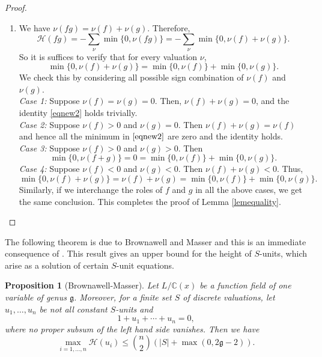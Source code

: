 \documentclass[12pt]{amsart}
\newtheorem{proposition}[theorem]{Proposition}
\newcommand{\C}{\mbox{$\mathbb C$}}     %
\begin{document}
\begin{proof}
\begin{enumerate}
            \[
            \min\{0,\nu(f+g)\}=\nu(f)=\min\{0,\nu(f)\}+\min\{0,\nu(g)\}
            \]and\eqref{eqnew1} holds. This completes the proof of part $(i)$.
            \item[($ii$)] We have $\nu(fg)=\nu(f)+\nu(g)$. Therefore,
            \begin{equation*}
                \mathcal{H}(fg)=-\sum_{\nu} \min \{0,\nu(fg)\}= -\sum_{\nu} \min \{0,\nu(f)+\nu(g)\}. 
            \end{equation*} So it is suffices to verify that for every valuation $\nu$,
            \begin{equation}\label{eqnew2}
                \min \{ 0,\nu (f)+\nu(g)\}=\min \{ 0,\nu (f)\}+\min \{ 0,\nu (g)\}.
            \end{equation} We check this by considering all possible sign combination of $\nu(f)$ and $\nu(g)$.\\
            \textit{Case 1:} Suppose $\nu(f)=\nu(g)=0$. Then, $\nu(f)+\nu(g)=0$, and the identity \eqref{eqnew2} holds trivially. \\
            \textit{Case 2:} Suppose $\nu(f)>0$ and $\nu(g)=0$. Then $\nu(f)+\nu(g)=\nu(f)$ and hence all the minimum in $\eqref{eqnew2}$ are zero and the identity holds.\\
            \textit{Case 3:} Suppose $\nu(f)>0$ and $\nu(g)>0$. Then 
            \[
            \min \{0, \nu(f+g)\}=0=\min \{0, \nu(f)\}+\min \{0, \nu(g)\}.
            \]
            \textit{Case 4:} Suppose $\nu(f)<0$ and $\nu(g)<0$. Then $\nu(f)+\nu(g)<0$. Thus, 
            \begin{equation*}
                \min \{ 0,\nu(f)+\nu(g)\}= \nu(f)+\nu(g)= \min \{ 0,\nu(f)\}+\min \{0,\nu(g)\}.
            \end{equation*}
             Similarly, if we interchange the roles of $f$ and $g$ in all the above cases, we get the same conclusion. This completes the proof of Lemma \ref{lemequality}.
        \end{enumerate} 
    \end{proof}
	
	The following theorem is due to Brownawell and Masser \cite{brow1986} and this is an immediate consequence of \cite[Theorem B, Corollary 1]{Fuchs2012}. This result gives an upper bound for the height of $S$-units, which arise as a solution of certain $S$-unit equations.
	\begin{proposition}[Brownawell-Masser]\label{browthm}
		Let $L/\C(x)$ be a function field of one variable of genus $\mathfrak{g}$. Moreover, for a finite set $S$ of discrete valuations, let $u_1, \ldots, u_n$ be not all constant $S$-units and 
		\[1+u_1+\cdots +u_n= 0,\] where no proper subsum of the left hand side vanishes. Then we have 
		\begin{equation*}\label{bmineq}
			\max_{i=1, \ldots, n} \mathcal{H}(u_i) \leq \binom{n}{2}(|S|+\max(0, 2\mathfrak{g}-2)). 
		\end{equation*}
	\end{proposition}
\end{document}
